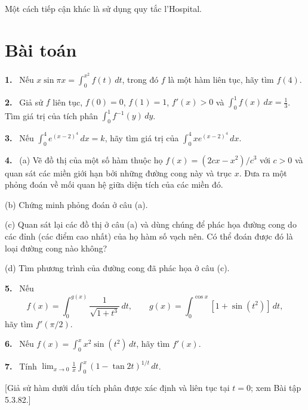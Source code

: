 \documentclass[12pt,a4paper]{article}
\newcommand{\bt}[1]{\par\smallskip\Needspace{5\baselineskip}\noindent\textbf{#1.}\ }
\begin{document}
Một cách tiếp cận khác là sử dụng quy tắc l’Hospital.

\section*{Bài toán}
\bt{1} Nếu $x\sin\pi x=\int_0^{x^2}f(t)\,dt$, trong đó $f$ là một hàm liên tục, hãy tìm $f(4)$.
\bt{2} Giả sử $f$ liên tục, $f(0)=0$, $f(1)=1$, $f'(x)>0$ và $\int_0^1f(x)\,dx=\frac13$. Tìm giá trị của tích phân $\int_0^1f^{-1}(y)\,dy$.
\bt{3} Nếu $\int_0^4e^{(x-2)^4}\,dx=k$, hãy tìm giá trị của $\int_0^4xe^{(x-2)^4}\,dx$.
\bt{4} (a) Vẽ đồ thị của một số hàm thuộc họ $f(x)=(2cx-x^2)/c^3$ với $c>0$ và quan sát các miền giới hạn bởi những đường cong này và trục $x$. Đưa ra một phỏng đoán về mối quan hệ giữa diện tích của các miền đó.
\par\noindent(b) Chứng minh phỏng đoán ở câu (a).
\par\noindent(c) Quan sát lại các đồ thị ở câu (a) và dùng chúng để phác họa đường cong do các đỉnh (các điểm cao nhất) của họ hàm số vạch nên. Có thể đoán được đó là loại đường cong nào không?
\par\noindent(d) Tìm phương trình của đường cong đã phác họa ở câu (c).
\bt{5} Nếu
\[f(x)=\int_0^{g(x)}\frac1{\sqrt{1+t^3}}\,dt,\qquad
g(x)=\int_0^{\cos x}[1+\sin(t^2)]\,dt,\]
hãy tìm $f'(\pi/2)$.
\bt{6} Nếu $f(x)=\int_0^xx^2\sin(t^2)\,dt$, hãy tìm $f'(x)$.
\bt{7} Tính $\displaystyle\lim_{x\to0}\frac1x\int_0^x(1-\tan2t)^{1/t}\,dt$.
\par\noindent{}[Giả sử hàm dưới dấu tích phân được xác định và liên tục tại $t=0$; xem Bài tập 5.3.82.]
\end{document}
